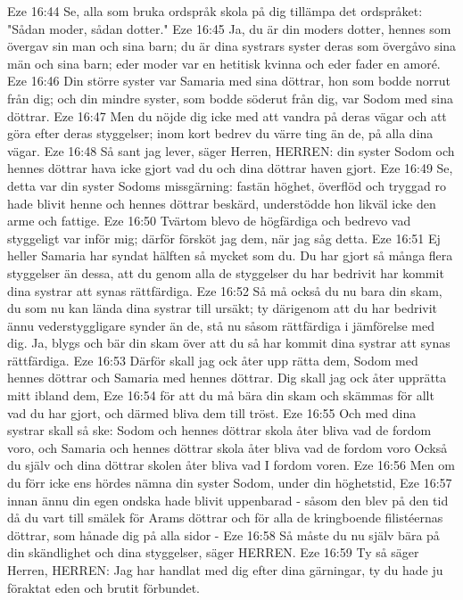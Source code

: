 Eze 16:44  Se, alla som bruka ordspråk skola på dig tillämpa det ordspråket: "Sådan moder, sådan dotter."
Eze 16:45  Ja, du är din moders dotter, hennes som övergav sin man och sina barn; du är dina systrars syster deras som övergåvo sina män och sina barn; eder moder var en hetitisk kvinna och eder fader en amoré.
Eze 16:46  Din större syster var Samaria med sina döttrar, hon som bodde norrut från dig; och din mindre syster, som bodde söderut från dig, var Sodom med sina döttrar.
Eze 16:47  Men du nöjde dig icke med att vandra på deras vägar och att göra efter deras styggelser; inom kort bedrev du värre ting än de, på alla dina vägar.
Eze 16:48  Så sant jag lever, säger Herren, HERREN: din syster Sodom och hennes döttrar hava icke gjort vad du och dina döttrar haven gjort.
Eze 16:49  Se, detta var din syster Sodoms missgärning: fastän höghet, överflöd och tryggad ro hade blivit henne och hennes döttrar beskärd, understödde hon likväl icke den arme och fattige.
Eze 16:50  Tvärtom blevo de högfärdiga och bedrevo vad styggeligt var inför mig; därför försköt jag dem, när jag såg detta.
Eze 16:51  Ej heller Samaria har syndat hälften så mycket som du. Du har gjort så många flera styggelser än dessa, att du genom alla de styggelser du har bedrivit har kommit dina systrar att synas rättfärdiga.
Eze 16:52  Så må också du nu bara din skam, du som nu kan lända dina systrar till ursäkt; ty därigenom att du har bedrivit ännu vederstyggligare synder än de, stå nu såsom rättfärdiga i jämförelse med dig. Ja, blygs och bär din skam över att du så har kommit dina systrar att synas rättfärdiga.
Eze 16:53  Därför skall jag ock åter upp rätta dem, Sodom med hennes döttrar och Samaria med hennes döttrar. Dig skall jag ock åter upprätta mitt ibland dem,
Eze 16:54  för att du må bära din skam och skämmas för allt vad du har gjort, och därmed bliva dem till tröst.
Eze 16:55  Och med dina systrar skall så ske: Sodom och hennes döttrar skola åter bliva vad de fordom voro, och Samaria och hennes döttrar skola åter bliva vad de fordom voro Också du själv och dina döttrar skolen åter bliva vad I fordom voren.
Eze 16:56  Men om du förr icke ens hördes nämna din syster Sodom, under din höghetstid,
Eze 16:57  innan ännu din egen ondska hade blivit uppenbarad - såsom den blev på den tid då du vart till smälek för Arams döttrar och för alla de kringboende filistéernas döttrar, som hånade dig på alla sidor -
Eze 16:58  Så måste du nu själv bära på din skändlighet och dina styggelser, säger HERREN.
Eze 16:59  Ty så säger Herren, HERREN: Jag har handlat med dig efter dina gärningar, ty du hade ju föraktat eden och brutit förbundet.
